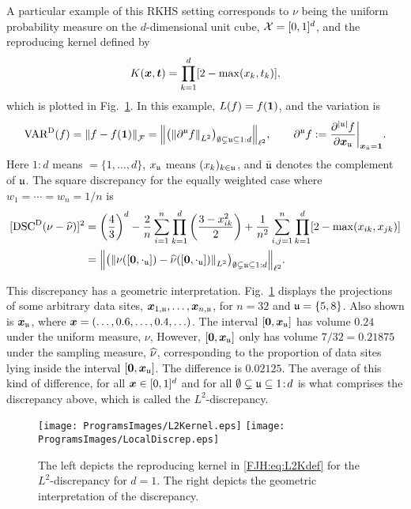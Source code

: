 \documentclass[graybox,footinfo]{svmult}
\begin{document}
A particular example of this RKHS setting corresponds to 
$\nu$ being the uniform probability measure on the $d$-dimensional unit cube, ${\mathcal{X}} 
= 
[0,1]^d$, and the reproducing kernel defined by \cite{Hic97a}
\begin{equation} \label{FJH:eq:L2Kdef}
K(\bsx,\bst) =\prod_{k = 1}^d [2 - \max(x_k,t_k)],
\end{equation}
which is plotted in Fig.\ \ref{FJH:fig:L2ker}.  In this example, $L(f) = f({\boldsymbol{1}})$, and the 
variation is 
\begin{equation*}
\textup{VAR}^{\textup{D}}(f)  = \left \lVert f-f({\boldsymbol{1}}) \right \rVert_{\mathcal{F}} = \Bigl \lVert \bigl ( \left \lVert \partial^{\mathfrak{u}} 
f \right \rVert_{L^2}\bigr 
)_{\emptyset \subsetneq {\mathfrak{u}} \subseteq 1:d} \Bigr \rVert_{\ell^2} , \qquad 
\partial^{\mathfrak{u}} f : = \frac{\partial^{\lvert{\mathfrak{u}}\rvert} f}{\partial {\boldsymbol{x}}_{\mathfrak{u}}} \biggr 
\rvert_{{\boldsymbol{x}}_{\bar{{\mathfrak{u}}}} = {\boldsymbol{1}}}.
\end{equation*}
Here $1\!:\!d$ means  $= \{1, \ldots, d\}$, $x_{\mathfrak{u}}$ means $(x_k)_{k \in {\mathfrak{u}}}$, and 
$\bar{{\mathfrak{u}}}$ 
denotes the complement of ${\mathfrak{u}}$.  
The square discrepancy for the equally weighted case where $w_1 = \cdots = w_n = 1/n$ 
is
\begin{align}
\nonumber
[\disc^\Dt(\nu - \hnu)]^2  &= \left(\frac 43\right)^d - \frac{2}n \sum_{i=1}^n \prod_{k=1}^d 
\left (\frac{3 - x_{ik}^2}{2} \right) + \frac{1}{n^2}\sum_{i,j=1}^n \prod_{k = 1}^d [2 - 
\max(x_{ik},x_{jk})] 
\\ &= \Bigl \lVert \bigl ( \norm{\nu([\bszero,\cdot_\fraku]) - 
	\hnu([\bszero,\cdot_\fraku])}_{L^2}\bigr )_{\emptyset \subsetneq \fraku \subseteq 1:d} 
	\Bigr 
	\rVert_{\ell^2}. \label{FJH:eq:L2disc}
\end{align}

This discrepancy has a geometric interpretation. Fig.\ \ref{FJH:fig:L2ker} displays the 
projections of some arbitrary 
data sites, ${\boldsymbol{x}}_{1,{\mathfrak{u}}}, \ldots, {\boldsymbol{x}}_{n,{\mathfrak{u}}}$, for $n=32$ and ${\mathfrak{u}} = \{5,8\}$.  
Also 
shown is ${\boldsymbol{x}}_{\mathfrak{u}}$, where ${\boldsymbol{x}} = (\ldots, 0.6, \ldots, 0.4, \ldots)$. The interval 
$[{\boldsymbol{0}},{\boldsymbol{x}}_{\mathfrak{u}}]$ has volume $0.24$ under the uniform measure, $\nu$, However, 
$[{\boldsymbol{0}},{\boldsymbol{x}}_{\mathfrak{u}}]$ only has 
volume $7/32 = 0.21875$ under the sampling measure, $\widehat{\nu}$, corresponding to the 
proportion of data sites lying inside the interval $[{\boldsymbol{0}},{\boldsymbol{x}}_{\mathfrak{u}}]$. The difference is 
$0.02125$.  The average of this kind of difference, for all ${\boldsymbol{x}} \in [0,1]^d$ and for all 
$\emptyset \subsetneq {\mathfrak{u}} 
\subseteq 1\!:\!d$ is what comprises the discrepancy above, which is called the 
$L^2$-discrepancy.
\begin{figure}
	\centering
	\texttt{[image: ProgramsImages/L2Kernel.eps]}\qquad
	\texttt{[image: ProgramsImages/LocalDiscrep.eps]}
	\caption{The left depicts the reproducing kernel in \eqref{FJH:eq:L2Kdef} for the 
	$L^2$-discrepancy 
	for $d=1$.  The right depicts the geometric interpretation of the discrepancy.
	\label{FJH:fig:L2ker}}
\end{figure}
\end{document}

